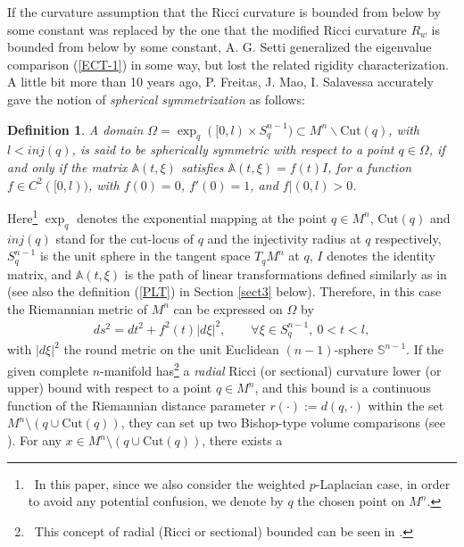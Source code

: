 \documentclass[12pt]{article}
\newtheorem{defn}[theorem]{Definition}
\begin{document}
If the curvature assumption that the Ricci curvature is bounded from
below by some constant was replaced by the one that the modified
Ricci curvature $R_{w}$ is bounded from below by some constant, A.
G. Setti \cite[Theorem 4.2]{SAG} generalized the eigenvalue
comparison (\ref{ECT-1}) in some way, but lost the related rigidity
characterization. A little bit more than 10 years ago, P. Freitas,
J. Mao, I. Salavessa \cite[Definition 2.1]{FMI} accurately gave the
notion of \emph{spherical symmetrization} as follows:
\begin{defn}
A domain $\Omega=\exp_q([0,l)\times{S}_q^{n-1}) \subset
M^{n}\backslash \mathrm{Cut}(q)$, with $l<inj(q)$,  is said to be
spherically symmetric with respect to a point $q\in \Omega$, if
 and only if
the matrix $\mathbb{A}(t,\xi)$ satisfies $\mathbb{A}(t,\xi)=f(t)I$,
for a function $f\in{C^{2}([0,l))}$,  with   $f(0)=0$, $f'(0)=1$,
and  $f|(0,l)>0$.
\end{defn}
\noindent Here\footnote{~In this paper, since we also consider the
weighted $p$-Laplacian case, in order to avoid any potential
confusion, we denote  by $q$ the chosen point on $M^n$.} $\exp_q$
denotes the exponential mapping at the point $q\in
 M^{n}$, $\mathrm{Cut}(q)$ and $inj(q)$ stand for the cut-locus of $q$ and the injectivity radius at
 $q$ respectively, ${S}_q^{n-1}$ is the unit sphere in the tangent
 space $T_{q}M^{n}$ at $q$, $I$ denotes the identity matrix, and $\mathbb{A}(t,\xi)$ is the path of linear
 transformations defined similarly as in \cite[p. 703]{FMI} (see also the definition (\ref{PLT}) in Section \ref{sect3} below).
 Therefore, in this case the Riemannian metric of $M^{n}$ can be
 expressed on $\Omega$ by
 \begin{eqnarray*}
ds^{2}=dt^{2}+f^{2}(t)|d\xi|^2, \qquad \forall\xi\in
S^{n-1}_{q},~0<t<l,
 \end{eqnarray*}
with $|d\xi|^2$ the round metric on the unit Euclidean
$(n-1)$-sphere $\mathbb{S}^{n-1}$. If the given complete
$n$-manifold has\footnote{~This concept of radial (Ricci or
sectional) bounded can be seen in \cite[Definition 2.2 and
Definition 2.3]{FMI}.} a \emph{radial} Ricci (or
 sectional) curvature lower (or upper) bound with respect to a point
 $q\in M^{n}$, and this bound is a continuous function of
 the Riemannian distance parameter $r(\cdot):=d(q,\cdot)$ within the set
 $M^{n}\setminus\left({q}\cup\mathrm{Cut}(q)\right)$, they can
 set up two Bishop-type volume comparisons (see \cite[Corollary 3.5 and Theorem
 4.2]{FMI}). For any $x\in
 M^{n}\setminus\left({q}\cup\mathrm{Cut}(q)\right)$, there exists a
\end{document}

